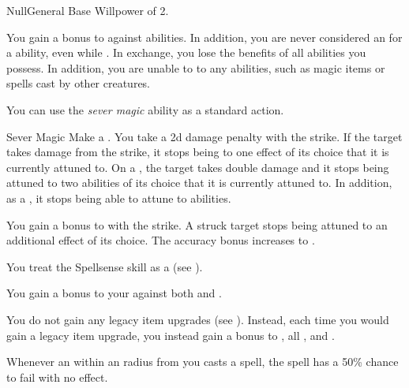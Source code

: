     \begin{feat}{Null}{General}
        \featpre Base Willpower of 2.

         You gain a  bonus to  against  abilities.
        In addition, you are never considered an  for a  ability, even while \unconscious.
        In exchange, you lose the benefits of all  abilities you possess.
        In addition, you are unable to  to any  abilities, such as magic items or spells cast by other creatures.

         You can use the \textit{sever magic} ability as a standard action.
        \begin{freeability}{Sever Magic}
            Make a .
            You take a \minus2d damage penalty with the strike.
            If the target takes damage from the strike, it stops being  to one effect of its choice that it is currently attuned to.
            On a , the target takes double damage and it stops being attuned to two abilities of its choice that it is currently attuned to.
            In addition, as a , it stops being able to attune to abilities.

            \rankline
             You gain a  bonus to  with the strike.
             A struck target stops being attuned to an additional effect of its choice.
             The accuracy bonus increases to .
        \end{freeability}

         You treat the Spellsense skill as a  (see ).

         You gain a  bonus to your  against both  and .

         You do not gain any legacy item upgrades (see ).
        Instead, each time you would gain a legacy item upgrade, you instead gain a  bonus to , all , and .

         Whenever an  within an \areamed radius from you casts a spell, the spell has a 50\% chance to fail with no effect.


\end{feat}
